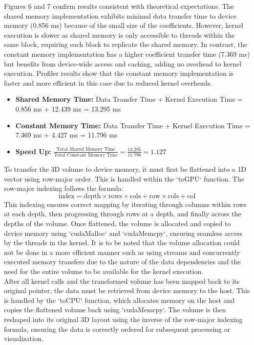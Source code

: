 \documentclass[journal,11pt]{IEEEtran}
\begin{document}
Figures 6 and 7 confirm results consistent with theoretical expectations. The shared memory implementation exhibits minimal data transfer time to device memory (0.856 ms) because of the small size of the coefficients. However, kernel execution is slower as shared memory is only accessible to threads within the same block, requiring each block to replicate the shared memory. In contrast, the constant memory implementation has a higher coefficient transfer time (7.369 ms) but benefits from device-wide access and caching, adding no overhead to kernel execution. Profiler results show that the constant memory implementation is faster and more efficient in this case due to reduced kernel overheads.

\begin{itemize}
    \item \textbf{Shared Memory Time:} Data Transfer Time + Kernel Execution Time = 0.856 ms + 12.439 ms = 13.295 ms
    \item \textbf{Constant Memory Time:} Data Transfer Time + Kernel Execution Time = 7.369 ms + 4.427 ms = 11.796 ms
    \item \textbf{Speed Up:} $\frac{\text{Total Shared Memory Time}}{\text{Total Constant Memory Time}} = \frac{13.295}{11.796} = 1.127$
\end{itemize}

To transfer the 3D volume to device memory, it must first be flattened into a 1D vector using row-major order. This is handled within the `toGPU` function. The row-major indexing follows the formula:  
\begin{equation}
    \text{index} = \text{depth} \times \text{rows} \times \text{cols} + \text{row} \times \text{cols} + \text{col}
\end{equation}  
This indexing ensures correct mapping by iterating through columns within rows at each depth, then progressing through rows at a depth, and finally across the depths of the volume. Once flattened, the volume is allocated and copied to device memory using `cudaMalloc` and `cudaMemcpy`, ensuring seamless access by the threads in the kernel. It is to be noted that the volume allocation could not be done in a more efficient manner such as using streams and concurrently executed memory transfers due to the nature of the data dependencies and the need for the entire volume to be available for the kernel execution.\\

After all kernel calls and the transformed volume has been mapped back to its original pointer, the data must be retrieved from device memory to the host. This is handled by the `toCPU` function, which allocates memory on the host and copies the flattened volume back using `cudaMemcpy`. The volume is then reshaped into its original 3D layout using the inverse of the row-major indexing formula, ensuring the data is correctly ordered for subsequent processing or visualization.\\
\end{document}
